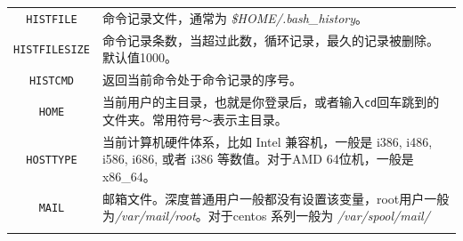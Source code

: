 \documentclass[doctor,openright,twoside]{sjtuthesis}
\newcommand{\passthrough}[1]{#1}
\theoremstyle{plain}
\theoremstyle{definition}
\theoremstyle{remark}
\theoremstyle{ocrenumbox}
\theoremstyle{plain}
\begin{document}
\begin{longtable}[]{@{}cl@{}}
\begin{minipage}[t]{0.23\columnwidth}
\passthrough{\lstinline!HISTFILE!}\strut
\end{minipage} & \begin{minipage}[t]{0.72\columnwidth}\raggedright
命令记录文件，通常为 \emph{\$HOME/.bash\_history}。\strut
\end{minipage}\tabularnewline
\begin{minipage}[t]{0.23\columnwidth}\centering
\passthrough{\lstinline!HISTFILESIZE!}\strut
\end{minipage} & \begin{minipage}[t]{0.72\columnwidth}\raggedright
命令记录条数，当超过此数，循环记录，最久的记录被删除。默认值1000。\strut
\end{minipage}\tabularnewline
\begin{minipage}[t]{0.23\columnwidth}\centering
\passthrough{\lstinline!HISTCMD!}\strut
\end{minipage} & \begin{minipage}[t]{0.72\columnwidth}\raggedright
返回当前命令处于命令记录的序号。\strut
\end{minipage}\tabularnewline
\begin{minipage}[t]{0.23\columnwidth}\centering
\passthrough{\lstinline!HOME!}\strut
\end{minipage} & \begin{minipage}[t]{0.72\columnwidth}\raggedright
当前用户的主目录，也就是你登录后，或者输入\passthrough{\lstinline!cd!}回车跳到的文件夹。常用符号\passthrough{\lstinline!～!}表示主目录。\strut
\end{minipage}\tabularnewline
\begin{minipage}[t]{0.23\columnwidth}\centering
\passthrough{\lstinline!HOSTTYPE!}\strut
\end{minipage} & \begin{minipage}[t]{0.72\columnwidth}\raggedright
当前计算机硬件体系，比如 Intel 兼容机，一般是 i386, i486, i586, i686, 或者 i386 等数值。对于AMD 64位机，一般是 x86\_64。\strut
\end{minipage}\tabularnewline
\begin{minipage}[t]{0.23\columnwidth}\centering
\passthrough{\lstinline!MAIL!}\strut
\end{minipage} & \begin{minipage}[t]{0.72\columnwidth}\raggedright
邮箱文件。深度普通用户一般都没有设置该变量，root用户一般为\emph{/var/mail/root}。对于centos 系列一般为 \emph{/var/spool/mail/}\strut
\end{minipage}\tabularnewline
\begin{minipage}[t]{0.23\columnwidth}\centering

\end{minipage}
\end{longtable}
\end{document}
